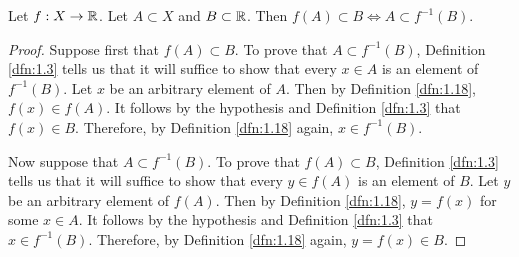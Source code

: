 \documentclass[../main.tex]{subfiles}
\begin{document}
\begin{exercise}\label{exr:9.3}
    Let $f:X\to\mathbb{R}$. Let $A\subset X$ and $B\subset\mathbb{R}$. Then $f(A)\subset B\Longleftrightarrow A\subset f^{-1}(B)$.
    \begin{proof}
        Suppose first that $f(A)\subset B$. To prove that $A\subset f^{-1}(B)$, Definition \ref{dfn:1.3} tells us that it will suffice to show that every $x\in A$ is an element of $f^{-1}(B)$. Let $x$ be an arbitrary element of $A$. Then by Definition \ref{dfn:1.18}, $f(x)\in f(A)$. It follows by the hypothesis and Definition \ref{dfn:1.3} that $f(x)\in B$. Therefore, by Definition \ref{dfn:1.18} again, $x\in f^{-1}(B)$.\par
        Now suppose that $A\subset f^{-1}(B)$. To prove that $f(A)\subset B$, Definition \ref{dfn:1.3} tells us that it will suffice to show that every $y\in f(A)$ is an element of $B$. Let $y$ be an arbitrary element of $f(A)$. Then by Definition \ref{dfn:1.18}, $y=f(x)$ for some $x\in A$. It follows by the hypothesis and Definition \ref{dfn:1.3} that $x\in f^{-1}(B)$. Therefore, by Definition \ref{dfn:1.18} again, $y=f(x)\in B$.
    \end{proof}
\end{exercise}
\end{document}
